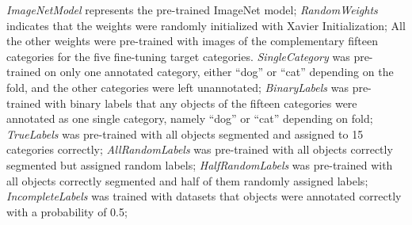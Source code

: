 \begin{table}[t]
{\textit{ImageNetModel} represents the pre-trained ImageNet model;
\textit{RandomWeights} indicates that the weights were randomly initialized with Xavier Initialization;
All the other weights were pre-trained with images of the complementary fifteen categories for the five fine-tuning target categories.
\textit{SingleCategory} was pre-trained on only one annotated category, either ``dog'' or ``cat'' depending on the fold, and the other categories were left unannotated;
\textit{BinaryLabels} was pre-trained with binary labels that any objects of the fifteen categories were annotated as one single category, namely ``dog'' or ``cat'' depending on fold;
\textit{TrueLabels} was pre-trained with all objects segmented and assigned to 15 categories correctly;
\textit{AllRandomLabels} was pre-trained with all objects correctly segmented but assigned random labels;
\textit{HalfRandomLabels} was pre-trained with all objects correctly segmented and half of them randomly assigned labels;
\textit{IncompleteLabels} was trained with datasets that objects were annotated correctly with a probability of 0.5;
}
\label{tab:objectness}
\end{table}
